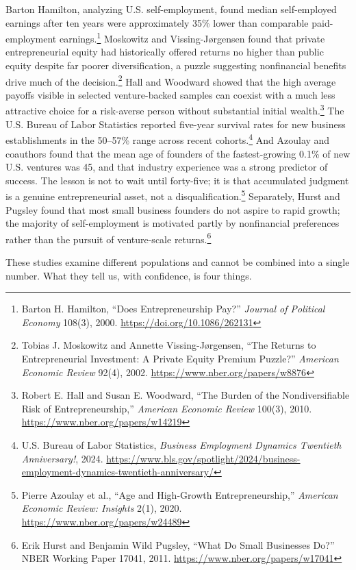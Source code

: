 Barton Hamilton, analyzing U.S. self-employment, found median self-employed earnings after ten years were approximately 35\% lower than comparable paid-employment earnings.\footnote{Barton H. Hamilton, ``Does Entrepreneurship Pay?'' \emph{Journal of Political Economy} 108(3), 2000. \url{https://doi.org/10.1086/262131}} Moskowitz and Vissing-Jørgensen found that private entrepreneurial equity had historically offered returns no higher than public equity despite far poorer diversification, a puzzle suggesting nonfinancial benefits drive much of the decision.\footnote{Tobias J. Moskowitz and Annette Vissing-Jørgensen, ``The Returns to Entrepreneurial Investment: A Private Equity Premium Puzzle?'' \emph{American Economic Review} 92(4), 2002. \url{https://www.nber.org/papers/w8876}} Hall and Woodward showed that the high average payoffs visible in selected venture-backed samples can coexist with a much less attractive choice for a risk-averse person without substantial initial wealth.\footnote{Robert E. Hall and Susan E. Woodward, ``The Burden of the Nondiversifiable Risk of Entrepreneurship,'' \emph{American Economic Review} 100(3), 2010. \url{https://www.nber.org/papers/w14219}} The U.S. Bureau of Labor Statistics reported five-year survival rates for new business establishments in the 50--57\% range across recent cohorts.\footnote{U.S. Bureau of Labor Statistics, \emph{Business Employment Dynamics Twentieth Anniversary!}, 2024. \url{https://www.bls.gov/spotlight/2024/business-employment-dynamics-twentieth-anniversary/}} And Azoulay and coauthors found that the mean age of founders of the fastest-growing 0.1\% of new U.S. ventures was 45, and that industry experience was a strong predictor of success. The lesson is not to wait until forty-five; it is that accumulated judgment is a genuine entrepreneurial asset, not a disqualification.\footnote{Pierre Azoulay et al., ``Age and High-Growth Entrepreneurship,'' \emph{American Economic Review: Insights} 2(1), 2020. \url{https://www.nber.org/papers/w24489}} Separately, Hurst and Pugsley found that most small business founders do not aspire to rapid growth; the majority of self-employment is motivated partly by nonfinancial preferences rather than the pursuit of venture-scale returns.\footnote{Erik Hurst and Benjamin Wild Pugsley, ``What Do Small Businesses Do?'' NBER Working Paper 17041, 2011. \url{https://www.nber.org/papers/w17041}}

These studies examine different populations and cannot be combined into a single number. What they tell us, with confidence, is four things.

